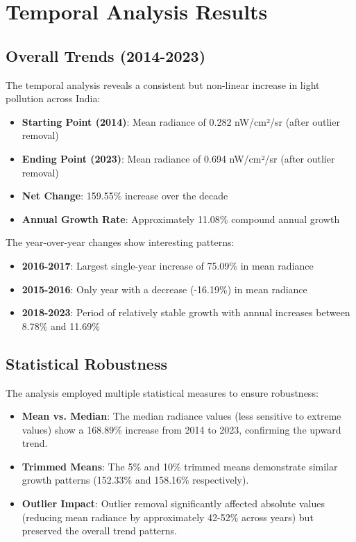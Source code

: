 \documentclass[12pt,a4paper]{article}
\begin{document}
\section{Temporal Analysis Results}

\subsection{Overall Trends (2014-2023)}
The temporal analysis reveals a consistent but non-linear increase in light pollution across India:

\begin{itemize}
    \item \textbf{Starting Point (2014)}: Mean radiance of 0.282 nW/cm²/sr (after outlier removal)
    \item \textbf{Ending Point (2023)}: Mean radiance of 0.694 nW/cm²/sr (after outlier removal)
    \item \textbf{Net Change}: 159.55\% increase over the decade
    \item \textbf{Annual Growth Rate}: Approximately 11.08\% compound annual growth
\end{itemize}

The year-over-year changes show interesting patterns:
\begin{itemize}
    \item \textbf{2016-2017}: Largest single-year increase of 75.09\% in mean radiance
    \item \textbf{2015-2016}: Only year with a decrease (-16.19\%) in mean radiance
    \item \textbf{2018-2023}: Period of relatively stable growth with annual increases between 8.78\% and 11.69\%
\end{itemize}

\subsection{Statistical Robustness}
The analysis employed multiple statistical measures to ensure robustness:

\begin{itemize}
    \item \textbf{Mean vs. Median}: The median radiance values (less sensitive to extreme values) show a 168.89\% increase from 2014 to 2023, confirming the upward trend.
    \item \textbf{Trimmed Means}: The 5\% and 10\% trimmed means demonstrate similar growth patterns (152.33\% and 158.16\% respectively).
    \item \textbf{Outlier Impact}: Outlier removal significantly affected absolute values (reducing mean radiance by approximately 42-52\% across years) but preserved the overall trend patterns.
\end{itemize}
\end{document}
